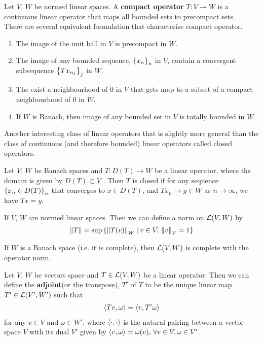 \documentclass{article}
\begin{document}
\begin{fdefinition} \label{def: compact operator}Let $V$, $W$ be normed linear spaces. A \textbf{compact operator} $T: V \to W$ is a continuous linear operator that maps all bounded sets to precompact sets. \\

There are several equivalent formulation that characterise compact operator. 
\begin{enumerate}
\item The image of the unit ball in $V$ is precompact in $W$. 
\item The image of any bounded sequence, $\set{x_n}_n$ in $V$, contain a convergent subsequence $\set{Tx_{n_j}}_j$ in $W$.
\item The exist a neighbourhood of 0 in $V$ that gets map to a subset of a compact neighbourhood of 0 in $W$. 
\item If $W$ is Banach, then image of any bounded set in $V$ is totally bounded in $W$. 
\end{enumerate}
\end{fdefinition}


Another interesting class of linear operators that is slightly more general than the class of continuous (and therefore bounded) linear operators called closed operators. 
\begin{fdefinition} Let $V$, $W$ be Banach spaces and $T: D(T) \to W$ be a linear operator, where the domain is given by $D(T) \subset V$ . Then $T$ is closed if for any sequence $\set{x_n \in D(T)}_n$ that converges to $x \in D(T)$, and $Tx_n \to y \in W$ as $n \to \infty$, we have $Tx = y$. 
\end{fdefinition}

\begin{fdefinition} If $V$, $W$ are normed linear spaces. Then we can define a norm on $\L(V, W)$ by 
\begin{align*}
\norm[T] = \sup \set{ \norm[T(v)]_W \wh v \in V, \, \norm[v]_V = 1}
\end{align*}
\end{fdefinition}


\begin{ftheorem}[Completeness of $\L(V, W)$] If $W$ is a Banach space (i.e. it is complete), then $\L(V, W)$ is complete with the operator norm. 
\end{ftheorem}

\begin{fdefinition}[Adjoint] Let $V$, $W$ be vectors space and $T \in \L(V, W)$ be a linear operator. Then we can define the \textbf{adjoint}(or the transpose), $T'$ of $T$ to be the unique linear map $T' \in \L(V', W')$ such that 
\begin{align*}
\inprod[Tv, \omega] = \inprod[v, T'\omega]
\end{align*}
for any $v \in V$ and $\omega \in W'$, where $\inprod$ is the natural pairing between a vector space $V$ with its dual $V'$ given by $\inprod[v, \omega] = \omega(v), \, \forall v \in V, \omega \in V'$. 
\end{fdefinition}
\end{document}
